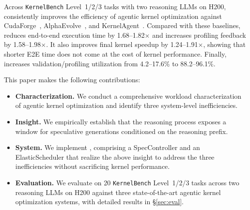 Across \texttt{KernelBench} Level~1/2/3 tasks with two reasoning LLMs on H200,
\sysname{} consistently improves the efficiency of agentic kernel optimization
against CudaForge~\cite{cudaforge}, AlphaEvolve~\cite{AlphaEvolve}, and KernelAgent~\cite{kernelagent2025}.
Compared with these baselines, \sysname{} reduces end-to-end execution time by
1.68--1.82$\times$ and increases profiling feedback by 1.58--1.98$\times$.
It also improves final kernel speedup by 1.24--1.91$\times$, showing that
shorter E2E time does not come at the cost of kernel performance.
Finally, \sysname{} increases validation/profiling utilization from
4.2--17.6\% to 88.2--96.1\%.

This paper makes the following contributions:
\begin{itemize}
    \item \textbf{Characterization.} We conduct a comprehensive workload characterization of agentic kernel optimization and identify three system-level inefficiencies.
    \item \textbf{Insight.} We empirically establish that the reasoning process exposes a window for
    speculative generations conditioned on the reasoning prefix.
    \item \textbf{System.} We implement \sysname{}, comprising a SpecController and an ElasticScheduler that realize the above insight to address the three inefficiencies without sacrificing kernel performance.
    \item \textbf{Evaluation.} We evaluate \sysname{} on 20 \texttt{KernelBench} Level~1/2/3 tasks across two reasoning LLMs on H200 against three state-of-the-art agentic kernel optimization systems, with detailed results in \S\ref{sec:eval}.
\end{itemize}
